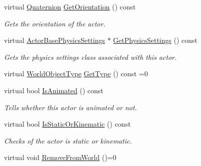 \begin{DoxyCompactItemize}
virtual \hyperlink{classMezzanine_1_1Quaternion}{Quaternion} \hyperlink{classMezzanine_1_1ActorBase_ac04f313c7e1272c519d0284bc98148a4}{GetOrientation} () const 
\begin{DoxyCompactList}\small\item\em Gets the orientation of the actor. \item\end{DoxyCompactList}\item 
virtual \hyperlink{classMezzanine_1_1ActorBasePhysicsSettings}{ActorBasePhysicsSettings} $\ast$ \hyperlink{classMezzanine_1_1ActorBase_a08c975572f1ab5cde651e1a6e5d9bb6a}{GetPhysicsSettings} () const 
\begin{DoxyCompactList}\small\item\em Gets the physics settings class associated with this actor. \item\end{DoxyCompactList}\item 
virtual \hyperlink{namespaceMezzanine_a30335416fc857844e8360c84d1d1b56c}{WorldObjectType} \hyperlink{classMezzanine_1_1ActorBase_a6e9cce7e660471cc0f9b9df019663f8d}{GetType} () const =0
\item 
virtual bool \hyperlink{classMezzanine_1_1ActorBase_ade1c3e7a2e24df64a79d2acb8d6fc084}{IsAnimated} () const 
\begin{DoxyCompactList}\small\item\em Tells whether this actor is animated or not. \item\end{DoxyCompactList}\item 
virtual bool \hyperlink{classMezzanine_1_1ActorBase_aae73855e5f3cded86c71955cc855026a}{IsStaticOrKinematic} () const 
\begin{DoxyCompactList}\small\item\em Checks of the actor is static or kinematic. \item\end{DoxyCompactList}\item 
\hypertarget{classMezzanine_1_1ActorBase_a30910dd0351bc29b2bf88cb3dc8d83db}{
virtual void \hyperlink{classMezzanine_1_1ActorBase_a30910dd0351bc29b2bf88cb3dc8d83db}{RemoveFromWorld} ()=0}
\label{classMezzanine_1_1ActorBase_a30910dd0351bc29b2bf88cb3dc8d83db}


\end{DoxyCompactItemize}
